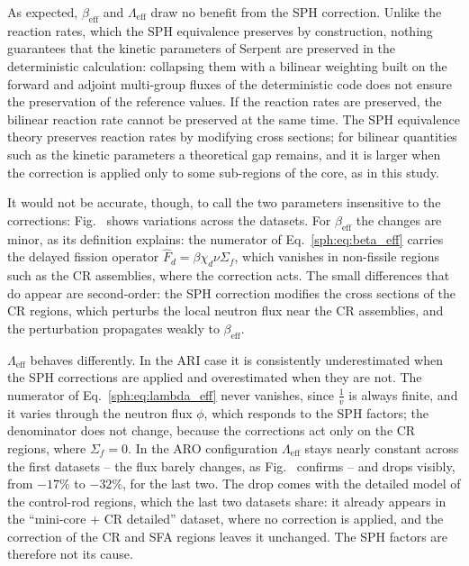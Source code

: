 As expected, $\beta_{\mathrm{eff}}$ and $\Lambda_{\mathrm{eff}}$ draw no benefit from the SPH correction. Unlike the reaction rates, which the SPH equivalence preserves by construction, nothing guarantees that the kinetic parameters of Serpent are preserved in the deterministic calculation: collapsing them with a bilinear weighting built on the forward and adjoint multi-group fluxes of the deterministic code does not ensure the preservation of the reference values. If the reaction rates are preserved, the bilinear reaction rate cannot be preserved at the same time. The SPH equivalence theory preserves reaction rates by modifying cross sections; for bilinear quantities such as the kinetic parameters a theoretical gap remains, and it is larger when the correction is applied only to some sub-regions of the core, as in this study.

It would not be accurate, though, to call the two parameters insensitive to the corrections: Fig.~ shows variations across the datasets. For $\beta_{\mathrm{eff}}$ the changes are minor, as its definition explains: the numerator of Eq.~\ref{sph:eq:beta_eff} carries the delayed fission operator $\hat{F}_d = \beta \chi_d \nu \Sigma_f$, which vanishes in non-fissile regions such as the CR assemblies, where the correction acts. The small differences that do appear are second-order: the SPH correction modifies the cross sections of the CR regions, which perturbs the local neutron flux near the CR assemblies, and the perturbation propagates weakly to $\beta_{\mathrm{eff}}$.

$\Lambda_{\mathrm{eff}}$ behaves differently. In the ARI case it is consistently underestimated when the SPH corrections are applied and overestimated when they are not. The numerator of Eq.~\ref{sph:eq:lambda_eff} never vanishes, since $\frac{1}{v}$ is always finite, and it varies through the neutron flux $\phi$, which responds to the SPH factors; the denominator does not change, because the corrections act only on the CR regions, where $\Sigma_f = 0$. In the ARO configuration $\Lambda_{\mathrm{eff}}$ stays nearly constant across the first datasets -- the flux barely changes, as Fig.~ confirms -- and drops visibly, from $-17\%$ to $-32\%$, for the last two. The drop comes with the detailed model of the control-rod regions, which the last two datasets share: it already appears in the ``mini-core + CR detailed'' dataset, where no correction is applied, and the correction of the CR and SFA regions leaves it unchanged. The SPH factors are therefore not its cause.

